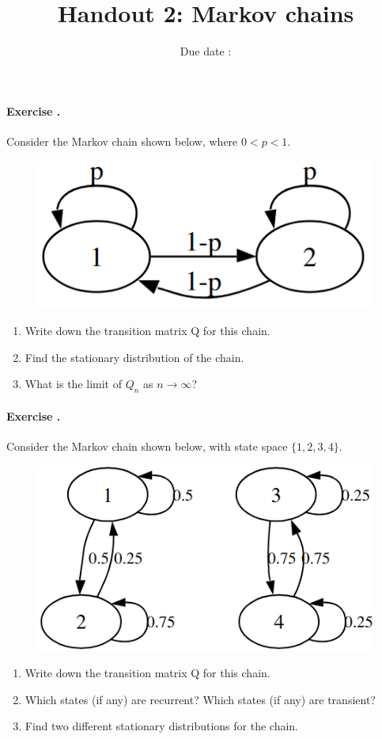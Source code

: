 \documentclass[12pt,a4paper]{article}
\title{ \bfseries \Huge {Handout 2: Markov chains}}
\date{Due date : }
\newcounter{num}  %
\begin{document}
	\maketitle
	\paragraph{Exercise \thenum.}%
		Consider the Markov chain shown below, where $0 < p < 1$.
		\begin{figure}[h!]
			\begin{center}
				\includegraphics[width = .25\textwidth]{images/markov_p_1-p.png}
			\end{center}
		\end{figure}
		\begin{enumerate}
			\item Write down the transition matrix Q for this chain.
			\item Find the stationary distribution of the chain.
			\item What is the limit of $Q_n$ as $n\rightarrow\infty$?
		\end{enumerate} 
		
	
\paragraph{Exercise \thenum.} %
	Consider the Markov chain shown below, with state space $\{1, 2, 3, 4\}$.
	\begin{figure}[h!]
		\begin{center}
			\includegraphics[width = .35\textwidth]{images/markov_2.png}
		\end{center}
	\end{figure}
	\begin{enumerate}
	\item Write down the transition matrix Q for this chain.
	\item Which states (if any) are recurrent? Which states (if any) are transient?
	\item Find two different stationary distributions for the chain.
	\end{enumerate} 
\end{document}
